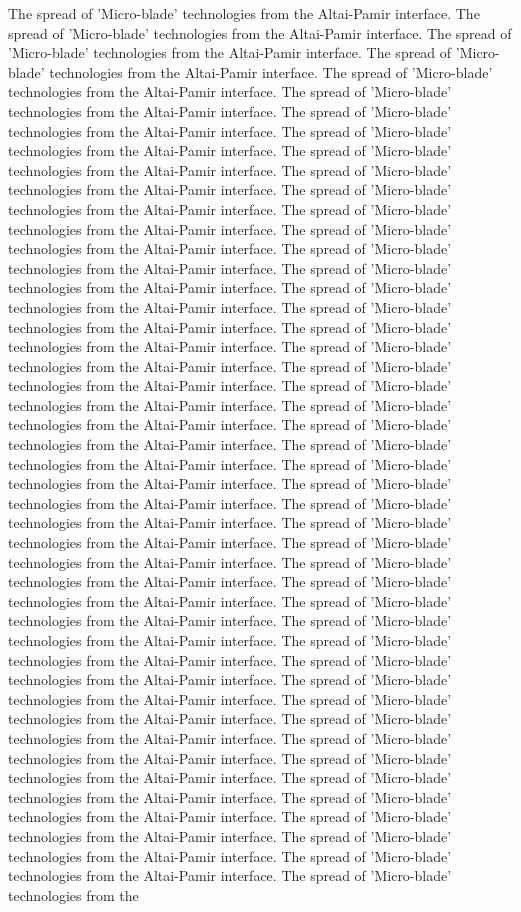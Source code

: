 The spread of 'Micro-blade' technologies from the Altai-Pamir interface. The spread of 'Micro-blade' technologies from the Altai-Pamir interface. The spread of 'Micro-blade' technologies from the Altai-Pamir interface. The spread of 'Micro-blade' technologies from the Altai-Pamir interface. The spread of 'Micro-blade' technologies from the Altai-Pamir interface. The spread of 'Micro-blade' technologies from the Altai-Pamir interface. The spread of 'Micro-blade' technologies from the Altai-Pamir interface. The spread of 'Micro-blade' technologies from the Altai-Pamir interface. The spread of 'Micro-blade' technologies from the Altai-Pamir interface. The spread of 'Micro-blade' technologies from the Altai-Pamir interface. The spread of 'Micro-blade' technologies from the Altai-Pamir interface. The spread of 'Micro-blade' technologies from the Altai-Pamir interface. The spread of 'Micro-blade' technologies from the Altai-Pamir interface. The spread of 'Micro-blade' technologies from the Altai-Pamir interface. The spread of 'Micro-blade' technologies from the Altai-Pamir interface. The spread of 'Micro-blade' technologies from the Altai-Pamir interface. The spread of 'Micro-blade' technologies from the Altai-Pamir interface. The spread of 'Micro-blade' technologies from the Altai-Pamir interface. The spread of 'Micro-blade' technologies from the Altai-Pamir interface. The spread of 'Micro-blade' technologies from the Altai-Pamir interface. The spread of 'Micro-blade' technologies from the Altai-Pamir interface. The spread of 'Micro-blade' technologies from the Altai-Pamir interface. The spread of 'Micro-blade' technologies from the Altai-Pamir interface. The spread of 'Micro-blade' technologies from the Altai-Pamir interface. The spread of 'Micro-blade' technologies from the Altai-Pamir interface. The spread of 'Micro-blade' technologies from the Altai-Pamir interface. The spread of 'Micro-blade' technologies from the Altai-Pamir interface. The spread of 'Micro-blade' technologies from the Altai-Pamir interface. The spread of 'Micro-blade' technologies from the Altai-Pamir interface. The spread of 'Micro-blade' technologies from the Altai-Pamir interface. The spread of 'Micro-blade' technologies from the Altai-Pamir interface. The spread of 'Micro-blade' technologies from the Altai-Pamir interface. The spread of 'Micro-blade' technologies from the Altai-Pamir interface. The spread of 'Micro-blade' technologies from the Altai-Pamir interface. The spread of 'Micro-blade' technologies from the Altai-Pamir interface. The spread of 'Micro-blade' technologies from the Altai-Pamir interface. The spread of 'Micro-blade' technologies from the Altai-Pamir interface. The spread of 'Micro-blade' technologies from the Altai-Pamir interface. The spread of 'Micro-blade' technologies from the Altai-Pamir interface. The spread of 'Micro-blade' technologies from the Altai-Pamir interface. The spread of 'Micro-blade' technologies from the Altai-Pamir interface. The spread of 'Micro-blade' technologies from the Altai-Pamir interface. The spread of 'Micro-blade' technologies from the Altai-Pamir interface. The spread of 'Micro-blade' technologies from the Altai-Pamir interface. The spread of 'Micro-blade' technologies from the Altai-Pamir interface. The spread of 'Micro-blade' technologies from the 